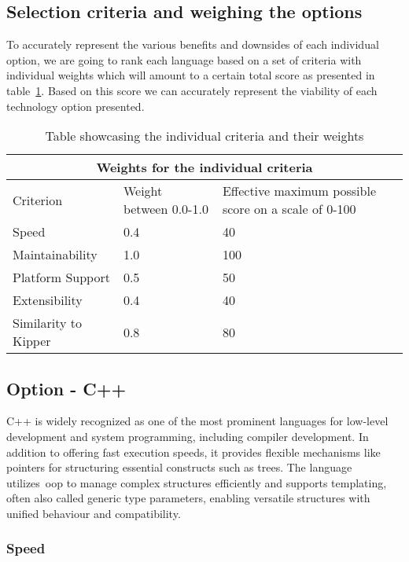 \subsection{Selection criteria and weighing the options}

To accurately represent the various benefits and downsides of each individual option, we are going to rank each language based on a set of criteria with individual weights which will amount to a certain total score as presented in table~\ref{tab:programming-language-criteria-weights}. Based on this score we can accurately represent the viability of each technology option presented.

\begin{table}[H]
	\centering
	\begin{tabular}{ |p{4cm}|p{5cm}|p{5cm}|  }
		\hline
		\multicolumn{3}{|c|}{Weights for the individual criteria} \\
		\hline
		Criterion&Weight between 0.0-1.0&Effective maximum possible score on a scale of 0-100\\
		\hline
		Speed&0.4&40\\
		Maintainability&1.0&100\\
		Platform Support&0.5&50\\
		Extensibility&0.4&40\\
		Similarity to Kipper&0.8&80\\
		\hline
	\end{tabular}
	\caption{Table showcasing the individual criteria and their weights}
	\label{tab:programming-language-criteria-weights}
\end{table}

\subsection{Option - C++}

C++ is widely recognized as one of the most prominent languages for low-level development and system programming, including compiler development. In addition to offering fast execution speeds, it provides flexible mechanisms like pointers for structuring essential constructs such as trees. The language utilizes~\acrshort{oop} to manage complex structures efficiently and supports templating, often also called generic type parameters, enabling versatile structures with unified behaviour and compatibility.

\subsubsection{Speed}


